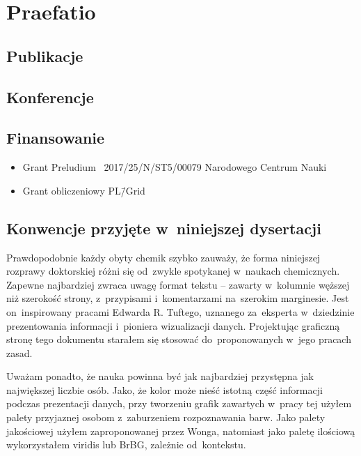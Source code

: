 \chapter{Praefatio}

\section{Publikacje}

\section{Konferencje}

\section{Finansowanie}

\begin{itemize}
  \item Grant Preludium \textnumero~2017/25/N/ST5/00079 Narodowego Centrum Nauki
  \item Grant obliczeniowy PL\=/Grid
\end{itemize}


\section{Konwencje przyjęte w~niniejszej dysertacji}

Prawdopodobnie każdy obyty chemik szybko zauważy, że forma niniejszej rozprawy doktorskiej różni się od~zwykle spotykanej w~naukach chemicznych.
Zapewne najbardziej zwraca uwagę format tekstu \--- zawarty w~kolumnie węższej niż szerokość strony, z~przypisami i~komentarzami na~szerokim marginesie.
Jest on~inspirowany pracami\autocite{Tufte2001,Tufte1990,Tufte1997,Tufte2006} Edwarda R. Tuftego,
uznanego za~eksperta w~dziedzinie prezentowania informacji i~pioniera wizualizacji danych\autocite{Yaffa2011}.
Projektując graficzną stronę tego dokumentu starałem się stosować do~proponowanych w~jego pracach zasad.

Uważam ponadto, że nauka powinna być jak najbardziej przystępna jak największej liczbie osób.
Jako, że kolor może nieść istotną część informacji podczas prezentacji danych,
przy tworzeniu grafik zawartych w~pracy tej użyłem palety przyjaznej osobom z~zaburzeniem rozpoznawania barw.
Jako palety jakościowej użyłem zaproponowanej przez Wonga\autocite{wong11},
natomiast jako paletę ilościową wykorzystałem viridis\autocite{Smith2015} lub BrBG, zależnie od~kontekstu.

